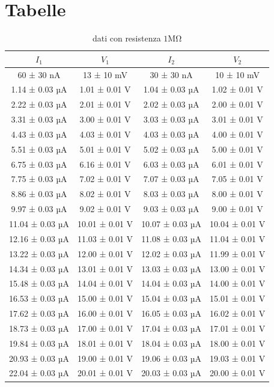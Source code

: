 \documentclass[a4paper]{article}
\begin{document}
\section{Tabelle}
\begin{table}[htbp]
\centering
\caption{dati con resistenza $1 \si{\mega\ohm}$}
\label{tab:resistenza1M}
\begin{tabular}{|c|c|c|c|}
\hline
$I_1$ & $V_1$ & $I_2$ & $V_2$ \\\hline\hline
60 ± 30 nA & 13 ± 10 mV & 30 ± 30 nA & 10 ± 10 mV \\
1.14 ± 0.03 µA & 1.01 ± 0.01 V & 1.04 ± 0.03 µA & 1.02 ± 0.01 V \\
2.22 ± 0.03 µA & 2.01 ± 0.01 V & 2.02 ± 0.03 µA & 2.00 ± 0.01 V \\
3.31 ± 0.03 µA & 3.00 ± 0.01 V & 3.03 ± 0.03 µA & 3.01 ± 0.01 V \\
4.43 ± 0.03 µA & 4.03 ± 0.01 V & 4.03 ± 0.03 µA & 4.00 ± 0.01 V \\
5.51 ± 0.03 µA & 5.01 ± 0.01 V & 5.02 ± 0.03 µA & 5.00 ± 0.01 V \\
6.75 ± 0.03 µA & 6.16 ± 0.01 V & 6.03 ± 0.03 µA & 6.01 ± 0.01 V \\
7.75 ± 0.03 µA & 7.02 ± 0.01 V & 7.07 ± 0.03 µA & 7.05 ± 0.01 V \\
8.86 ± 0.03 µA & 8.02 ± 0.01 V & 8.03 ± 0.03 µA & 8.00 ± 0.01 V \\
9.97 ± 0.03 µA & 9.02 ± 0.01 V & 9.03 ± 0.03 µA & 9.00 ± 0.01 V \\
11.04 ± 0.03 µA & 10.01 ± 0.01 V & 10.07 ± 0.03 µA & 10.04 ± 0.01 V \\
12.16 ± 0.03 µA & 11.03 ± 0.01 V & 11.08 ± 0.03 µA & 11.04 ± 0.01 V \\
13.22 ± 0.03 µA & 12.00 ± 0.01 V & 12.02 ± 0.03 µA & 11.99 ± 0.01 V \\
14.34 ± 0.03 µA & 13.01 ± 0.01 V & 13.03 ± 0.03 µA & 13.00 ± 0.01 V \\
15.48 ± 0.03 µA & 14.04 ± 0.01 V & 14.04 ± 0.03 µA & 14.00 ± 0.01 V \\
16.53 ± 0.03 µA & 15.00 ± 0.01 V & 15.04 ± 0.03 µA & 15.01 ± 0.01 V \\
17.62 ± 0.03 µA & 16.00 ± 0.01 V & 16.05 ± 0.03 µA & 16.02 ± 0.01 V \\
18.73 ± 0.03 µA & 17.00 ± 0.01 V & 17.04 ± 0.03 µA & 17.01 ± 0.01 V \\
19.84 ± 0.03 µA & 18.01 ± 0.01 V & 18.04 ± 0.03 µA & 18.00 ± 0.01 V \\
20.93 ± 0.03 µA & 19.00 ± 0.01 V & 19.06 ± 0.03 µA & 19.03 ± 0.01 V \\
22.04 ± 0.03 µA & 20.01 ± 0.01 V & 20.03 ± 0.03 µA & 20.00 ± 0.01 V \\
\hline
\end{tabular}
\end{table}
\end{document}
